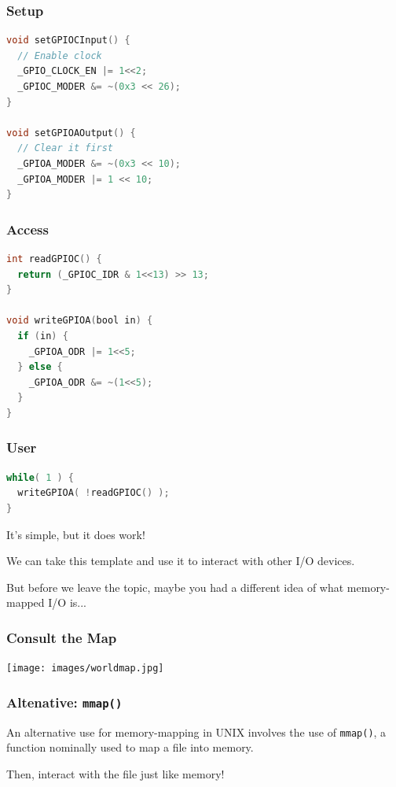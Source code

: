 \begin{frame}[fragile]
\frametitle{Setup}

\begin{lstlisting}[language=C]
void setGPIOCInput() {
  // Enable clock
  _GPIO_CLOCK_EN |= 1<<2;
  _GPIOC_MODER &= ~(0x3 << 26);
}

void setGPIOAOutput() {
  // Clear it first
  _GPIOA_MODER &= ~(0x3 << 10);
  _GPIOA_MODER |= 1 << 10;
}
\end{lstlisting}

\end{frame}

\begin{frame}[fragile]
\frametitle{Access}

\begin{lstlisting}[language=C]
int readGPIOC() {
  return (_GPIOC_IDR & 1<<13) >> 13;
}

void writeGPIOA(bool in) {
  if (in) {
    _GPIOA_ODR |= 1<<5;
  } else {
    _GPIOA_ODR &= ~(1<<5);
  }
}
\end{lstlisting}

\end{frame}

\begin{frame}[fragile]
\frametitle{User}

\begin{lstlisting}[language=C]
while( 1 ) {
  writeGPIOA( !readGPIOC() ); 
}
\end{lstlisting}

It's simple, but it does work!

We can take this template and use it to interact with other I/O devices.

But before we leave the topic, maybe you had a different idea of what memory-mapped I/O is...

\end{frame}



\begin{frame}
	\frametitle{Consult the Map}

	\begin{center}
		\texttt{[image: images/worldmap.jpg]}
	\end{center}


\end{frame}


\begin{frame}
	\frametitle{Altenative: \texttt{mmap()}}

	An alternative use for memory-mapping in UNIX involves the use of \texttt{mmap()}, a function nominally used to map a file into memory.

	Then, interact with the file just like memory!

\end{frame}


